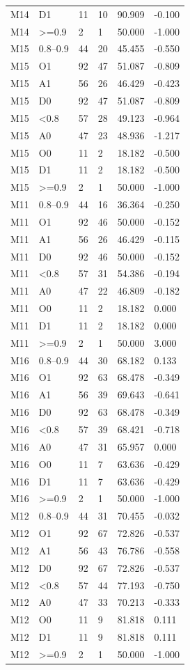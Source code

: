 {\begin{longtable}{llllll}
M14 & D1 & 11 & 10 & 90.909 & -0.100 \\
M14 & \textgreater{}=0.9 & 2 & 1 & 50.000 & -1.000 \\
M15 & 0.8–0.9 & 44 & 20 & 45.455 & -0.550 \\
M15 & O1 & 92 & 47 & 51.087 & -0.809 \\
M15 & A1 & 56 & 26 & 46.429 & -0.423 \\
M15 & D0 & 92 & 47 & 51.087 & -0.809 \\
M15 & \textless{}0.8 & 57 & 28 & 49.123 & -0.964 \\
M15 & A0 & 47 & 23 & 48.936 & -1.217 \\
M15 & O0 & 11 & 2 & 18.182 & -0.500 \\
M15 & D1 & 11 & 2 & 18.182 & -0.500 \\
M15 & \textgreater{}=0.9 & 2 & 1 & 50.000 & -1.000 \\
M11 & 0.8–0.9 & 44 & 16 & 36.364 & -0.250 \\
M11 & O1 & 92 & 46 & 50.000 & -0.152 \\
M11 & A1 & 56 & 26 & 46.429 & -0.115 \\
M11 & D0 & 92 & 46 & 50.000 & -0.152 \\
M11 & \textless{}0.8 & 57 & 31 & 54.386 & -0.194 \\
M11 & A0 & 47 & 22 & 46.809 & -0.182 \\
M11 & O0 & 11 & 2 & 18.182 & 0.000 \\
M11 & D1 & 11 & 2 & 18.182 & 0.000 \\
M11 & \textgreater{}=0.9 & 2 & 1 & 50.000 & 3.000 \\
M16 & 0.8–0.9 & 44 & 30 & 68.182 & 0.133 \\
M16 & O1 & 92 & 63 & 68.478 & -0.349 \\
M16 & A1 & 56 & 39 & 69.643 & -0.641 \\
M16 & D0 & 92 & 63 & 68.478 & -0.349 \\
M16 & \textless{}0.8 & 57 & 39 & 68.421 & -0.718 \\
M16 & A0 & 47 & 31 & 65.957 & 0.000 \\
M16 & O0 & 11 & 7 & 63.636 & -0.429 \\
M16 & D1 & 11 & 7 & 63.636 & -0.429 \\
M16 & \textgreater{}=0.9 & 2 & 1 & 50.000 & -1.000 \\
M12 & 0.8–0.9 & 44 & 31 & 70.455 & -0.032 \\
M12 & O1 & 92 & 67 & 72.826 & -0.537 \\
M12 & A1 & 56 & 43 & 76.786 & -0.558 \\
M12 & D0 & 92 & 67 & 72.826 & -0.537 \\
M12 & \textless{}0.8 & 57 & 44 & 77.193 & -0.750 \\
M12 & A0 & 47 & 33 & 70.213 & -0.333 \\
M12 & O0 & 11 & 9 & 81.818 & 0.111 \\
M12 & D1 & 11 & 9 & 81.818 & 0.111 \\
M12 & \textgreater{}=0.9 & 2 & 1 & 50.000 & -1.000 \\
\end{longtable}}

